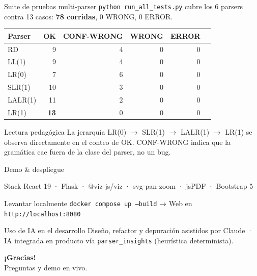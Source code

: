 \documentclass[aspectratio=169,10pt]{beamer}
\begin{document}
\begin{frame}{Suite de pruebas multi-parser}
  \texttt{python run\_all\_tests.py} cubre los 6 parsers contra 13 casos:
  \textbf{78 corridas}, 0 WRONG, 0 ERROR.

  \begin{center}
  \footnotesize
  \begin{tabular}{lrrrrr}
    \toprule
    \textbf{Parser} & \textbf{OK} & \textbf{CONF-WRONG} & \textbf{WRONG} & \textbf{ERROR} \\
    \midrule
    RD       &  9 & 4 & 0 & 0 \\
    LL(1)    &  9 & 4 & 0 & 0 \\
    LR(0)    &  7 & 6 & 0 & 0 \\
    SLR(1)   & 10 & 3 & 0 & 0 \\
    LALR(1)  & 11 & 2 & 0 & 0 \\
    LR(1)    & \textbf{13} & 0 & 0 & 0 \\
    \bottomrule
  \end{tabular}
  \end{center}

  \begin{exampleblock}{Lectura pedagógica}
    La jerarquía LR(0) $\to$ SLR(1) $\to$ LALR(1) $\to$ LR(1) se observa
    directamente en el conteo de OK. CONF-WRONG indica que la gramática
    cae fuera de la clase del parser, no un bug.
  \end{exampleblock}
\end{frame}

\begin{frame}{Demo \& despliegue}
  \begin{block}{Stack}
    React 19 · Flask · @viz-js/viz · svg-pan-zoom · jsPDF · Bootstrap 5
  \end{block}

  \begin{block}{Levantar localmente}
    \texttt{docker compose up --build}   \quad → \quad
    Web en \texttt{http://localhost:8080}
  \end{block}

  \begin{block}{Uso de IA en el desarrollo}
    Diseño, refactor y depuración asistidos por Claude · IA integrada
    en producto vía \texttt{parser\_insights} (heurística determinista).
  \end{block}

  \vspace{6pt}
  \centering
  \Large\textbf{¡Gracias!}\\
  \small
  Preguntas y demo en vivo.
\end{frame}
\end{document}
